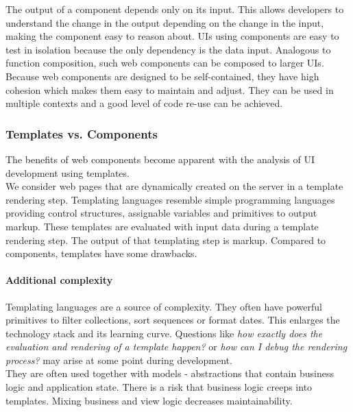 The output of a component depends only on its input. This allows developers to understand the change in the output depending on the change in the input, making the component easy to reason about. UIs using components are easy to test in isolation because the only dependency is the data input. Analogous to function composition, such web components can be composed to larger UIs. Because web components are designed to be self-contained, they have high cohesion which makes them easy to maintain and adjust. They can be used in multiple contexts and a good level of code re-use can be achieved.

\subsubsection{Templates vs. Components}
The benefits of web components become apparent with the analysis of UI development using templates. \\
We consider web pages that are dynamically created on the server in a template rendering step. Templating languages resemble simple programming languages providing control structures, assignable variables and primitives to output markup. These templates are evaluated with input data during a template rendering step. The output of that templating step is markup. Compared to components, templates have some drawbacks.

\paragraph{Additional complexity} Templating languages are a source of complexity. They often have powerful primitives to filter collections, sort sequences or format dates. This enlarges the technology stack and its learning curve. Questions like \textit{how exactly does the evaluation and rendering of a template happen?} or \textit{how can I debug the rendering process?} may arise at some point during development. \\
They are often used together with models - abstractions that contain business logic and application state. There is a risk that business logic creeps into templates. Mixing business and view logic decreases maintainability.

